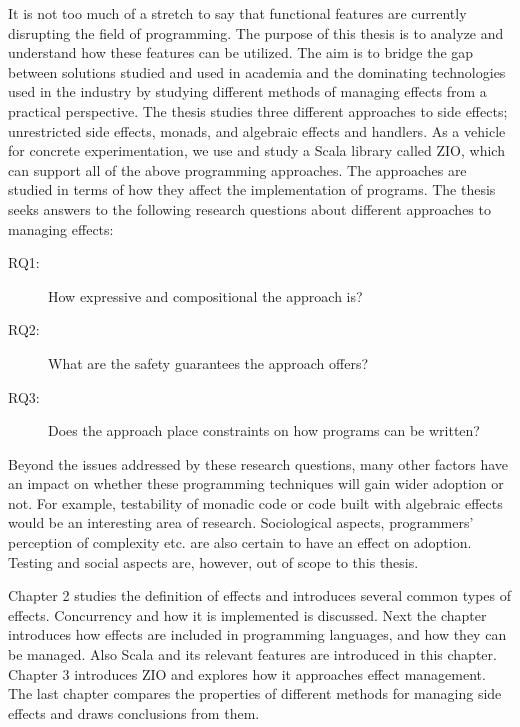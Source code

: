 It is not too much of a stretch to say that functional features are currently disrupting the field of programming. The purpose of this thesis is to analyze and understand how these features can be utilized. The aim is to bridge the gap between solutions studied and used in academia and the dominating technologies used in the industry by studying different methods of managing effects from a practical perspective. The thesis studies three different approaches to side effects; unrestricted side effects, monads, and algebraic effects and handlers. As a vehicle for concrete experimentation, we use and study a Scala library called ZIO, which can support all of the above programming approaches. The approaches are studied in terms of how they affect the implementation of programs. The thesis seeks answers to the following research questions about different approaches to managing effects:
\begin{description}
    \item[RQ1:] How expressive and compositional the approach is?
    \item[RQ2:] What are the safety guarantees the approach offers?
    \item[RQ3:] Does the approach place constraints on how programs can be written?
\end{description}

Beyond the issues addressed by these research questions, many other factors have an impact on whether these programming techniques will gain wider adoption or not. For example, testability of monadic code or code built with algebraic effects would be an interesting area of research. Sociological aspects, programmers' perception of complexity etc. are also certain to have an effect on adoption.
Testing and social aspects are, however, out of scope to this thesis.

Chapter 2 studies the definition of effects and introduces several common types of effects. Concurrency and how it is implemented is discussed. Next the chapter introduces how effects are included in programming languages, and how they can be managed. Also Scala and its relevant features are introduced in this chapter. Chapter 3 introduces ZIO and explores how it approaches effect management.  The last chapter compares the properties of different methods for managing side effects and draws conclusions from them.


